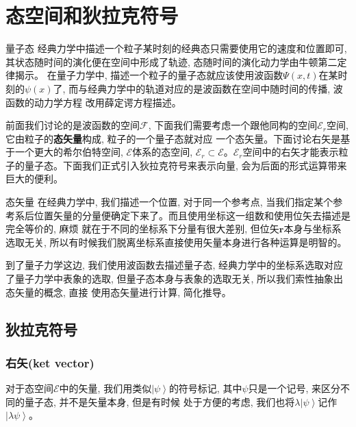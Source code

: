 \section{态空间和狄拉克符号}
\begin{proposition}{量子态}
    \setlength\parindent{2em}经典力学中描述一个粒子某时刻的经典态只需要使用它的速度和位置即可, 其状态随时间的演化便在空间中形成了轨迹, 态随时间的演化动力学由牛顿第二定律揭示。
    在量子力学中, 描述一个粒子的量子态就应该使用波函数$\Psi(x,t)$在某时刻的$\psi(x)$了, 而与经典力学中的轨道对应的是波函数在空间中随时间的传播, 波函数的动力学方程
    改用薛定谔方程描述。
\end{proposition}
前面我们讨论的是波函数的空间$\mathscr{F}$, 下面我们需要考虑一个跟他同构的空间$\mathscr{E}_r$空间, 它由粒子的\textbf{态矢量}构成, 粒子的一个量子态就对应
一个态矢量。下面讨论右矢是基于一个更大的希尔伯特空间, $\mathscr{E}$体系的态空间, $\mathscr{E}_r\subset\mathscr{E}$。$\mathscr{E}_r$空间中的右矢才能表示粒子的量子态。下面我们正式引入狄拉克符号来表示向量, 会为后面的形式运算带来巨大的便利。
\begin{proposition}{态矢量}
    \setlength\parindent{2em}在经典力学中, 我们描述一个位置, 对于同一个参考点, 当我们指定某个参考系后位置矢量的分量便确定下来了。而且使用坐标这一组数和使用位矢去描述是完全等价的, 麻烦
    就在于不同的坐标系下分量有很大差别, 但位矢$\bm{r}$本身与坐标系选取无关, 所以有时候我们脱离坐标系直接使用矢量本身进行各种运算是明智的。


    \setlength\parindent{2em}到了量子力学这边, 我们使用波函数去描述量子态, 经典力学中的坐标系选取对应了量子力学中表象的选取, 但量子态本身与表象的选取无关, 所以我们索性抽象出态矢量的概念, 直接
    使用态矢量进行计算, 简化推导。
\end{proposition}
\subsection*{狄拉克符号}
\subsubsection*{右矢(ket vector)}
对于态空间$\mathscr{E}$中的矢量, 我们用类似$\left | \psi  \right \rangle $的符号标记, 其中$\psi$只是一个记号, 来区分不同的量子态, 并不是矢量本身, 但是有时候
处于方便的考虑, 我们也将$\lambda\left | \psi  \right \rangle $记作$\left | \lambda\psi  \right \rangle $。
